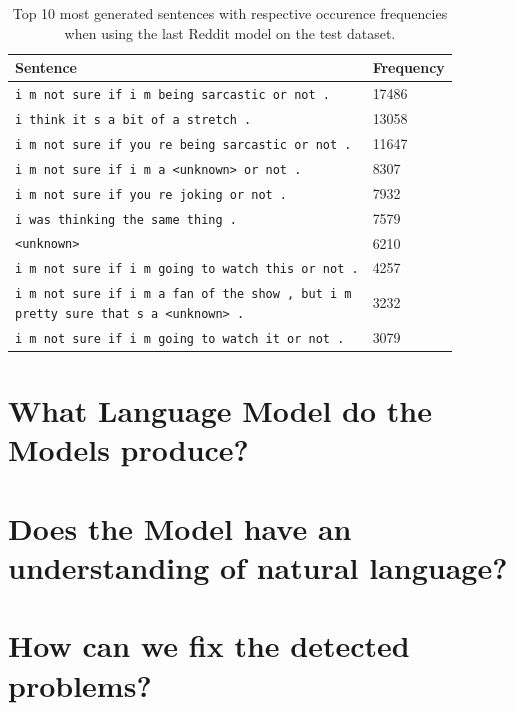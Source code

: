 \begin{table}[H]
\centering
{}
\begin{adjustbox}{max width=\textwidth}
	\begin{tabular}{ll}
		\toprule
		Sentence & Frequency\\ \midrule
		\texttt{i m not sure if i m being sarcastic or not .} & 17486\\
		\texttt{i think it s a bit of a stretch .} & 13058\\
		\texttt{i m not sure if you re being sarcastic or not .} & 11647\\
		\texttt{i m not sure if i m a <unknown> or not .} & 8307\\
		\texttt{i m not sure if you re joking or not .} & 7932\\
		\texttt{i was thinking the same thing .} & 7579\\
		\texttt{<unknown>} & 6210\\
		\texttt{i m not sure if i m going to watch this or not .} & 4257\\
		\specialcell{\texttt{i m not sure if i m a fan of the show , but i m}\\\texttt{pretty sure that s a <unknown> .}} & 3232\\
		\texttt{i m not sure if i m going to watch it or not .} & 3079\\
		\bottomrule
	\end{tabular}
\end{adjustbox}
\caption{Top 10 most generated sentences with respective occurence frequencies when using the last Reddit model on the test dataset.}
\label{results:test_performance:reddit_sample_outputs}
\end{table}

\section{What Language Model do the Models produce?}
\blindtext

\section{Does the Model have an understanding of natural language?}
\blindtext

\section{How can we fix the detected problems?}
\blindtext


